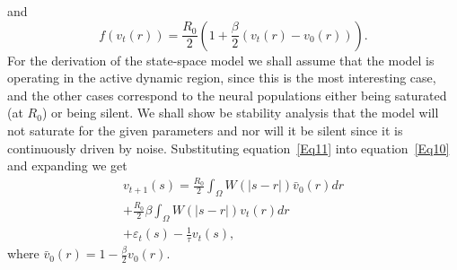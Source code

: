 \documentclass[journal]{IEEEtran}
\begin{document}
and
\begin{equation}\label{Eq12}
f\left( {{v_t}\left( r \right)} \right) = \frac{{{R_0}}}{2}\left( {1 + \frac{\beta }{2}\left( {{v_t}\left( r \right) - {v_0}\left( r \right)} \right)} \right).
\end{equation}
For the derivation of the state-space model we shall assume that the model is operating in the active dynamic region, since this is the most interesting case, and the other cases correspond to the neural populations either being saturated (at $R_0$) or being silent. We shall show be stability analysis that the model will not saturate for the given parameters and nor will it be silent since it is continuously driven by noise. Substituting equation~\ref{Eq11} into equation~\ref{Eq10} and expanding we get
\begin{align}\label{Eq13}
 {v_{t + 1}}\left( s \right) = \frac{{{R_0}}}{2}\int_\Omega  {W\left( {\left| {s - r} \right|} \right){{\bar v}_0}\left( r \right)dr}  \nonumber \\
  + \frac{{{R_0}}}{2}\beta \int_\Omega  {W\left( {\left| {s - r} \right|} \right){v_t}\left( r \right)dr}  \\
  + {\varepsilon _t}\left( s \right) - \frac{1}{\tau }{v_t}\left( s \right), \nonumber
\end{align}
where ${\bar v_0}\left( r \right) = 1 - \frac{\beta }{2}{v_0}\left( r \right)$.
\end{document}
